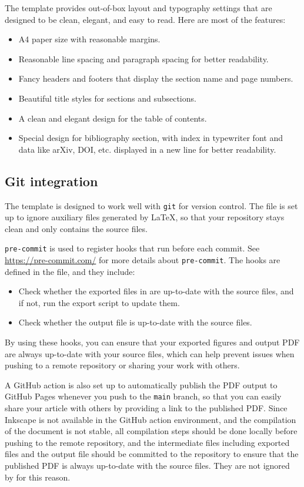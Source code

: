 The template provides out-of-box layout and typography settings that are designed to be clean, elegant, and easy to read.
Here are most of the features:
\begin{itemize}
  \item A4 paper size with reasonable margins.
  \item Reasonable line spacing and paragraph spacing for better readability.
  \item Fancy headers and footers that display the section name and page numbers.
  \item Beautiful title styles for sections and subsections.
  \item A clean and elegant design for the table of contents.
  \item Special design for bibliography section, with index in typewriter font and data like arXiv, DOI, etc. displayed in a new line for better readability.
\end{itemize}

\subsection{Git integration}

The template is designed to work well with \texttt{git} for version control.
The  file is set up to ignore auxiliary files generated by \LaTeX, so that your repository stays clean and only contains the source files.

\texttt{pre-commit} is used to register hooks that run before each commit.
See \url{https://pre-commit.com/} for more details about \texttt{pre-commit}.
The hooks are defined in the  file, and they include:
\begin{itemize}
  \item Check whether the exported  files in  are up-to-date with the source  files, and if not, run the export script to update them.
  \item Check whether the output  file is up-to-date with the source files.
\end{itemize}
By using these hooks, you can ensure that your exported figures and output PDF are always up-to-date with your source files, which can help prevent issues when pushing to a remote repository or sharing your work with others.

A GitHub action is also set up to automatically publish the PDF output to GitHub Pages whenever you push to the \texttt{main} branch, so that you can easily share your article with others by providing a link to the published PDF.
Since Inkscape is not available in the GitHub action environment, and the compilation of the document is not stable, all compilation steps should be done locally before pushing to the remote repository, and the intermediate files including exported  files and the output  file should be committed to the repository to ensure that the published PDF is always up-to-date with the source files.
They are not ignored by  for this reason.
